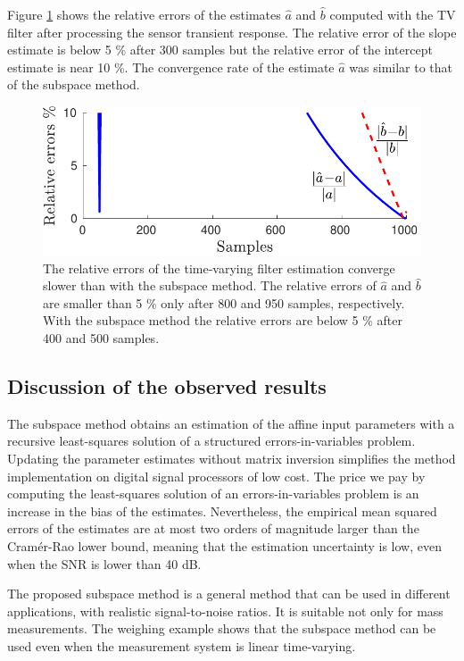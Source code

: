 {{Figure \ref{fig:rele_tv_40dB_s1} shows the relative errors of the estimates $\widehat{a}$ and $\widehat{b}$ computed with the TV filter after processing the sensor transient response.
The relative error of the slope estimate is below 5 \% after 300 samples but the relative error of the intercept estimate is near 10 \%.
The convergence rate of the estimate $\widehat{a}$ was similar to that of the subspace method.

\begin{figure}[!htbp]
\centering
\includegraphics[width=1\columnwidth]{./ChapterRampInput/fig/Fig_9.pdf} 
\caption{ \label{fig:rele_tv_40dB_s1} The relative errors of the time-varying filter estimation converge slower than with the subspace method. 
The relative errors of $\widehat{a}$ and $\widehat{b}$ are smaller than 5 \% only after 800 and 950 samples, respectively.
With the subspace method the relative errors are below 5 \% after 400 and 500 samples. }
\end{figure}



\subsection{Discussion of the observed results}

The subspace method obtains an estimation of the affine input parameters with a recursive least-squares solution of a structured errors-in-variables problem.
Updating the parameter estimates without matrix inversion simplifies the method implementation on digital signal processors of low cost.
The price we pay by computing the least-squares solution of an errors-in-variables problem is an increase in the bias of the estimates.
Nevertheless, the empirical mean squared errors of the estimates are at most two orders of magnitude larger than the Cram\'er-Rao lower bound, meaning that the estimation uncertainty is low, even when the SNR is lower than 40 dB.


The proposed subspace method is a general method that can be used in different applications, with realistic signal-to-noise ratios. 
It is suitable not only for mass measurements.
The weighing example shows that the subspace method can be used even when the measurement system is linear time-varying.

}}
